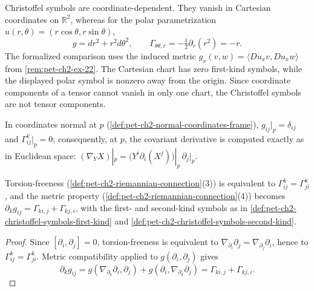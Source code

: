 \begin{remark}
  \label{rem:pet-ch2-christoffel-non-tensorial}
  \leanok
  Christoffel symbols are
  coordinate-dependent. They vanish in Cartesian coordinates on
  $\mathbb{R}^2$, whereas for the polar parametrization
  $u(r,\theta)=(r\cos\theta,r\sin\theta)$,
  \[
    g=dr^2+r^2d\theta^2,\qquad
    \Gamma_{\theta\theta,r}=-\tfrac12\partial_r(r^2)=-r.
  \]
  \sketch
  The formalized comparison uses the induced metric
  $g_x(v,w)=\langle Du_xv,Du_xw\rangle$ from
  \cref{rem:pet-ch2-ex-22}. The Cartesian chart has zero first-kind symbols,
  while the displayed polar symbol is nonzero away from the origin. Since
  coordinate components of a tensor cannot vanish in only one chart, the
  Christoffel symbols are not tensor components.
\end{remark}

\begin{remark}
  \label{rem:pet-ch2-christoffel-normal-coordinates}
  \leanok
  In coordinates normal at $p$ (\cref{def:pet-ch2-normal-coordinates-frame}),
  $g_{ij}|_p=\delta_{ij}$ and $\Gamma^k_{ij}|_p=0$; consequently, at $p$, the
  covariant derivative is computed exactly as in Euclidean space:
  $(\nabla_YX)|_p=\big(Y^i\partial_i(X^j)\big)|_p\,\partial_j|_p$.
\end{remark}

\begin{proposition}
  \label{prop:pet-ch2-christoffel-symmetry-metric-property}
  \leanok
  Torsion-freeness (\cref{def:pet-ch2-riemannian-connection}(3)) is equivalent
  to $\Gamma^k_{ij}=\Gamma^k_{ji}$, and the metric property
  (\cref{def:pet-ch2-riemannian-connection}(4)) becomes
  $\partial_kg_{ij}=\Gamma_{ki,j}+\Gamma_{kj,i}$, with the first- and
  second-kind symbols as in
  \cref{def:pet-ch2-christoffel-symbols-first-kind} and
  \cref{def:pet-ch2-christoffel-symbols-second-kind}.
\end{proposition}
\begin{proof}
  \leanok
  \sketch
  Since
  $[\partial_i,\partial_j]=0$, torsion-freeness is equivalent to
  $\nabla_{\partial_i}\partial_j=\nabla_{\partial_j}\partial_i$, hence to
  $\Gamma^k_{ij}=\Gamma^k_{ji}$. Metric compatibility applied to
  $g(\partial_i,\partial_j)$ gives
  \[
    \partial_k g_{ij}
      =g(\nabla_{\partial_k}\partial_i,\partial_j)
       +g(\partial_i,\nabla_{\partial_k}\partial_j)
      =\Gamma_{ki,j}+\Gamma_{kj,i}.
  \]
\end{proof}


